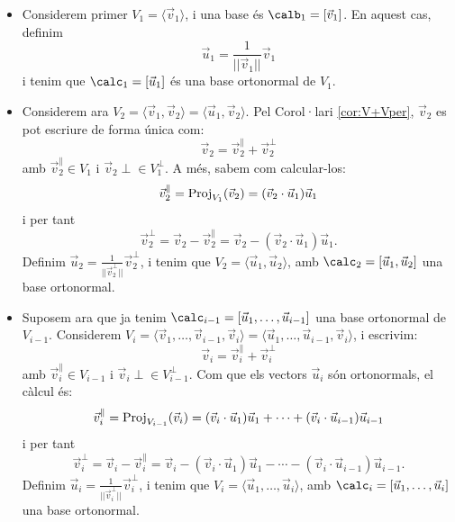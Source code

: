 \begin{itemize}
    \item Considerem primer $V_1=\langle \vec v_1 \rangle$, i una base és $\calb_1=[\vec v_1]$. En aquest cas, definim 
    \[\vec u_1=\frac{1}{||\vec v_1||} \vec v_1\]
    i tenim que $\calc_1=[\vec u_1]$ és una base ortonormal de $V_1$.
    \item Considerem ara $V_2=\langle \vec v_1, \vec v_2 \rangle=\langle \vec u_1, \vec v_2 \rangle$. Pel Corol·lari \ref{cor:V+Vper}, $\vec v_2$ es pot escriure de forma única com:
    \[
    \vec v_2 = \vec v_2^\parallel + \vec v_2^\perp
    \]
    amb $\vec v_2^\parallel\in V_1$ i $\vec v_2\perp \in V_1^\perp$. A més, sabem com calcular-los:
    \[
    \vec v_2^\parallel = \operatorname{Proj}_{V_1}(\vec v_2)=(\vec v_2 \cdot \vec u_1)\vec u_1
    \]
    i per tant
    \[
    \vec v_2^\perp = \vec v_2 - \vec v_2^\parallel = \vec v_2 - (\vec v_2 \cdot \vec u_1)\vec u_1.
    \]
    Definim $\vec u_2=\frac{1}{||\vec v_2^\perp||}\vec v_2^\perp$, i tenim que $V_2=\langle \vec u_1, \vec u_2\rangle$, amb $\calc_2=[\vec u_1,\vec u_2]$ una base ortonormal.
    \item Suposem ara que ja tenim $\calc_{i-1}=[\vec u_1, \dots, \vec u_{i-1}]$ una base ortonormal de $V_{i-1}$. Considerem $V_i=\langle\vec v_1, \dots, \vec v_{i-1},\vec v_i\rangle=\langle\vec u_1, \dots, \vec u_{i-1},\vec v_i\rangle$, i escrivim:
    \[
    \vec v_i = \vec v_i^\parallel + \vec v_i^\perp
    \]
    amb $\vec v_i^\parallel\in V_{i-1}$ i $\vec v_i\perp \in V_{i-1}^\perp$. Com que els vectors $\vec u_i$ són ortonormals, el càlcul és:
    \[
    \vec v_i^\parallel = \operatorname{Proj}_{V_{i-1}}(\vec v_i)=(\vec v_i \cdot \vec u_1)\vec u_1+ \cdots + (\vec v_i \cdot \vec u_{i-1})\vec u_{i-1}
    \]
    i per tant
    \[
    \vec v_i^\perp = \vec v_i - \vec v_i^\parallel = \vec v_i - (\vec v_i \cdot \vec u_1)\vec u_1- \cdots -(\vec v_i \cdot \vec u_{i-1})\vec u_{i-1}.
    \]
    Definim $\vec u_i=\frac{1}{||\vec v_i^\perp||}\vec v_i^\perp$, i tenim que $V_i=\langle \vec u_1, \dots ,\vec u_i\rangle$, amb $\calc_i=[\vec u_1,\dots,\vec u_i]$ una base ortonormal.
\end{itemize}
